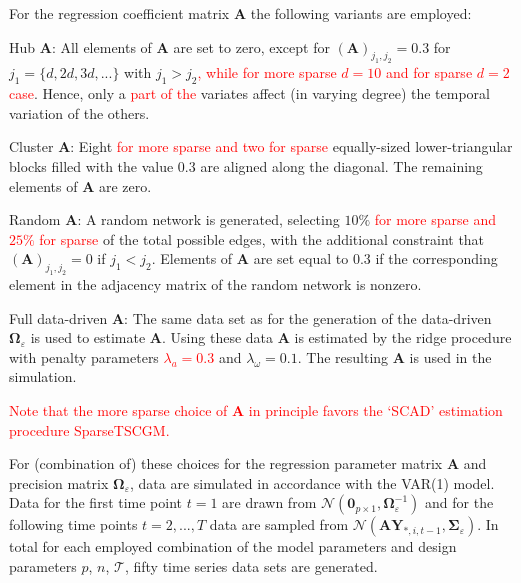 \documentclass[a4paper,11pt]{article}
\begin{document}
\noindent
For the regression coefficient matrix $\mathbf{A}$ the following variants are employed:
\begin{compactitem}
\item Hub $\mathbf{A}$: All elements of $\mathbf{A}$ are set to zero, except for $(\mathbf{A})_{j_1, j_2}=0.3$ for $j_1=\{d,2d,3d,...\}$ with $j_1>j_2$\textcolor{red}{, while for more sparse $d=10$ and for sparse $d=2$ case}. Hence, only a \textcolor{red}{part of the} variates affect (in varying degree) the temporal variation of the others.

\item Cluster $\mathbf{A}$: Eight \textcolor{red}{for more sparse and two for sparse} equally-sized lower-triangular blocks filled with the value 0.3 are aligned along the diagonal. The remaining elements of $\mathbf{A}$ are zero.

\item Random $\mathbf{A}$: A random network is generated, selecting $10\%$ \textcolor{red}{ for more sparse and $25\%$ for sparse} of the total possible edges, with the additional constraint that $(\mathbf{A})_{j_1, j_2}=0$ if $j_1<j_2$. Elements of $\mathbf{A}$ are set equal to $0.3$ if the corresponding element in the adjacency matrix of the random network is nonzero.

\item Full data-driven $\mathbf{A}$: The same data set as for the generation of the data-driven $\mathbf{\Omega}_{\varepsilon}$ is used to estimate $\mathbf{A}$. Using these data $\mathbf{A}$ is estimated by the ridge procedure with penalty parameters \textcolor{red}{$\lambda_a=0.3$} and $\lambda_{\omega}=0.1$. The resulting $\mathbf{A}$ is used in the simulation.

\end{compactitem}
\textcolor{red}{Note that the more sparse choice of $\mathbf{A}$ in principle favors the `SCAD' estimation procedure SparseTSCGM.}

For (combination of) these choices for the regression parameter matrix $\mathbf{A}$ and precision matrix $\mathbf{\Omega}_{\varepsilon}$, data are simulated in accordance with the VAR(1) model. Data for the first time point $t=1$ are drawn from $\mathcal{N}(\mathbf{0}_{p \times 1}, \mathbf{\Omega}_{\varepsilon}^{-1})$ and for the following time points $t=2,...,T$ data are sampled from $\mathcal{N}(\mathbf{A}\mathbf{Y}_{*,i,t-1},\mathbf{\Sigma}_{\varepsilon})$. In total for each employed combination of the model parameters and design parameters $p$, $n$, $\mathcal{T}$, fifty time series data sets are generated.
\end{document}
